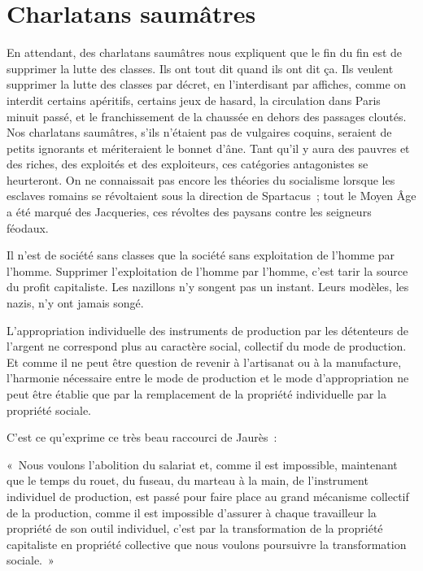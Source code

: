 \documentclass[french,twoside]{book} %
\newenvironment{quoteblock}%
  {\begin{quoting}}
  {\end{quoting}}
\newenvironment{quotebar}{%
    \def\FrameCommand{{\color{rubric!10!}\vrule width 0.5em} \hspace{0.9em}}%
    \def\OuterFrameSep{\itemsep} %
    \MakeFramed {\advance\hsize-\width \FrameRestore}
  }%
  {%
    \endMakeFramed
  }
\renewenvironment{quoteblock}%
  {%
    \savenotes
    \setstretch{0.9}
    \normalfont
    \begin{quotebar}
  }
  {%
    \end{quotebar}
    \spewnotes
  }
\begin{document}
\section[Charlatans saumâtres]{Charlatans saumâtres}
\noindent En attendant, des charlatans saumâtres nous expliquent que le fin du fin est de supprimer la lutte des classes. Ils ont tout dit quand ils ont dit ça. Ils veulent supprimer la lutte des classes par décret, en l’interdisant par affiches, comme on interdit certains apéritifs, certains jeux de hasard, la circulation dans Paris minuit passé, et le franchissement de la chaussée en dehors des passages cloutés. Nos charlatans saumâtres, s’ils n’étaient pas de vulgaires coquins, seraient de petits ignorants et mériteraient le bonnet d’âne. Tant qu’il y aura des pauvres et des riches, des exploités et des exploiteurs, ces catégories antagonistes se heurteront. On ne connaissait pas encore les théories du socialisme lorsque les esclaves romains se révoltaient sous la direction de Spartacus ; tout le Moyen Âge a été marqué des Jacqueries, ces révoltes des paysans contre les seigneurs féodaux.\par
Il n’est de société sans classes que la société sans exploitation de l’homme par l’homme. Supprimer l’exploitation de l’homme par l’homme, c’est tarir la source du profit capitaliste.   Les nazillons n’y songent pas un instant. Leurs modèles, les nazis, n’y ont jamais songé.\par
L’appropriation individuelle des instruments de production par les détenteurs de l’argent ne correspond plus au caractère social, collectif du mode de production. Et comme il ne peut être question de revenir à l’artisanat ou à la manufacture, l’harmonie nécessaire entre le mode de production et le mode d’appropriation ne peut être établie que par la remplacement de la propriété individuelle par la propriété sociale.\par
C’est ce qu’exprime ce très beau raccourci de Jaurès :\par

\begin{quoteblock}
 \noindent « Nous voulons l’abolition du salariat et, comme il est impossible, maintenant que le temps du rouet, du fuseau, du marteau à la main, de l’instrument individuel de production, est passé pour faire place au grand mécanisme collectif de la production, comme il est impossible d’assurer à chaque travailleur la propriété de son outil individuel, c’est par la transformation de la propriété capitaliste en propriété collective que nous voulons poursuivre la transformation sociale. »
 \end{quoteblock}
\end{document}

